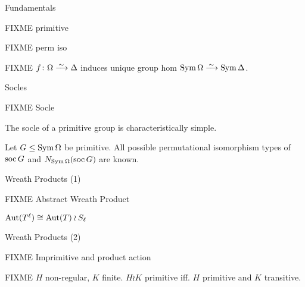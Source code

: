 \begin{frame}{Fundamentals}
    \begin{defn}
        FIXME primitive
    \end{defn}
    \begin{defn}
        FIXME perm iso
    \end{defn}
    \begin{rem}
        FIXME
        $f \from \Omega \iso \Delta$ induces unique
        group hom
        $\sym \Omega \iso \sym \Delta$.
    \end{rem}
\end{frame}


\begin{frame}{Socles}
    \begin{defn}
        FIXME Socle
    \end{defn}

    \begin{thm}
        The socle of a primitive group is characteristically simple.
    \end{thm}

    \begin{thm}
        Let $G \leq \operatorname{Sym} \Omega$ be primitive.
        All possible permutational isomorphism types of $\operatorname{soc} G$ and
        $N_{\operatorname{Sym} \Omega}(\operatorname{soc} G)$ are known.
    \end{thm}
\end{frame}

\begin{frame}{Wreath Products (1)}
    \begin{defn}
        FIXME Abstract Wreath Product
    \end{defn}

    \begin{thm}
        $\operatorname{Aut}( T ^ \ell ) \cong \operatorname{Aut}(T) \wr S_\ell$
    \end{thm}
\end{frame}

\begin{frame}{Wreath Products (2)}
    \begin{defn}
        FIXME Imprimitive and product action
    \end{defn}

    \begin{thm}
        FIXME
        $H$ non-regular, $K$ finite.
        $H \wr K$ primitive
        iff.
        $H$ primitive and $K$ transitive.
    \end{thm}
\end{frame}

